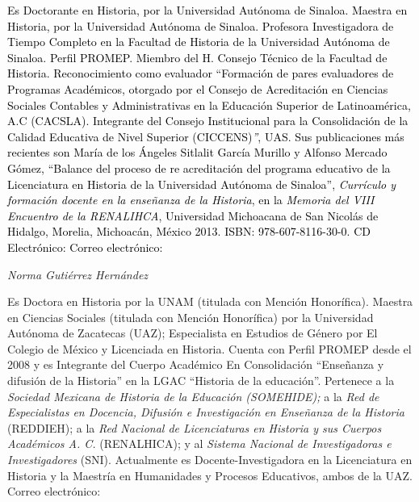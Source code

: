 { 
\textcolor{black}{Es Doctorante en Historia, por la Universidad Autónoma de
Sinaloa. Maestra en Historia, por la Universidad Autónoma de Sinaloa.
Profesora Investigadora de Tiempo Completo en la Facultad de Historia de la
Universidad Autónoma de Sinaloa. Perfil PROMEP. Miembro del H. Consejo
Técnico de la Facultad de Historia. Reconocimiento como evaluador
“Formación de pares evaluadores de Programas Académicos, otorgado por el
Consejo de Acreditación en Ciencias Sociales Contables y Administrativas en
la Educación Superior de Latinoamérica, A.C (CACSLA).  Integrante del
Consejo Institucional para la Consolidación de la Calidad Educativa de
Nivel Superior (CICCENS)}\textit{\textcolor{black}{”}}\textcolor{black}{,
UAS. Sus publicaciones más recientes son  María de los Ángeles Sitlalit
García Murillo y Alfonso Mercado Gómez,  “Balance del proceso de re
acreditación del programa educativo de la Licenciatura en Historia de la
Universidad Autónoma de Sinaloa”, }\textit{\textcolor{black}{Currículo y
formación docente en la enseñanza de la
}}\textit{\textcolor{black}{Historia}}\textcolor{black}{, en la
}\textit{\textcolor{black}{Memoria del VIII Encuentro de la
RENALIHCA}}\textcolor{black}{, Universidad Michoacana de San Nicolás de
Hidalgo, Morelia, Michoacán, México 2013.  ISBN: 978-607-8116-30-0. CD
Electrónico: Correo electrónico:
}\href{mailto:sitlalit_77@hotmail.com}{}}


\bigskip

{ 
\textit{Norma Gutiérrez Hernández }}

{ 
Es Doctora en Historia por la UNAM (titulada con Mención Honorífica).
Maestra en Ciencias Sociales (titulada con Mención Honorífica) por la
Universidad Autónoma de Zacatecas (UAZ); Especialista en Estudios de Género
por El Colegio de México y Licenciada en Historia.  Cuenta con Perfil
PROMEP desde el 2008 y es Integrante del Cuerpo Académico En Consolidación
“Enseñanza y difusión de la Historia”  en la LGAC “Historia de la
educación”.  Pertenece a la \textit{Sociedad Mexicana de Historia de la
Educación (SOMEHIDE); }a\textit{ }la \textit{Red de Especialistas en
Docencia, Difusión e Investigación en Enseñanza de la Historia} (REDDIEH);
a la \textit{Red Nacional de Licenciaturas en Historia y sus Cuerpos
Académicos A. C.} (RENALHICA); y al \textit{Sistema Nacional de
Investigadoras e Investigadores} (SNI). Actualmente es
Docente-Investigadora en la Licenciatura en Historia y la Maestría en
Humanidades y Procesos Educativos, ambos de la UAZ. Correo electrónico:
\href{mailto:ninive_17@yahoo.com.mx}{}
 }



